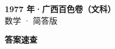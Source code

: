 \documentclass[zihao=-4, a4paper]{ctexart}
\begin{document}
\begin{center}
  {\Large\bfseries 1977 年·广西百色卷（文科）}\\[4pt]
  {\large 数学 · 简答版}
\end{center}
\medskip
{}

\clearpage
{}
\begin{center}{\Large\bfseries 答案速查}\end{center}
\medskip

\end{document}
